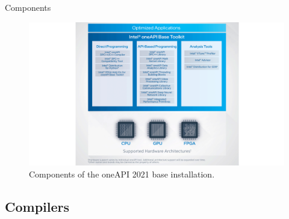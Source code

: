 \documentclass[aspectratio=169]{beamer}
\begin{document}
\begin{frame}{Components}
\begin{figure}
  \includegraphics[width=0.75\linewidth]{figures/diagram-onapi-base-toolkit-16x9.png}
  \caption{Components of the oneAPI 2021 base installation.}
\end{figure}
\end{frame}

\subsection{Compilers}
\end{document}
